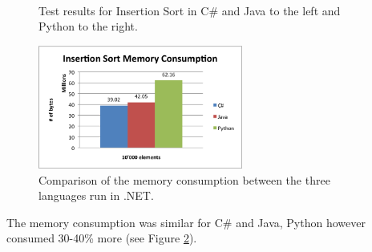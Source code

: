 \begin{figure}[h]
	\centering
	\mbox{
	}
	\caption{Test results for Insertion Sort in C\# and Java to the left and Python to the right.}
	\label{fig:insertion_sort_graphs}
\end{figure} 

\begin{figure}[h]
	\centering
	\includegraphics[width=0.6\textwidth]{chapters/media/insertion_sort_memory.png}
	\caption{Comparison of the memory consumption between the three languages run in .NET.}
	\label{fig:insertion_sort_memory}
\end{figure}

The memory consumption was similar for C\# and Java, Python however consumed 30-40\% more (see Figure \ref{fig:insertion_sort_memory}).




















